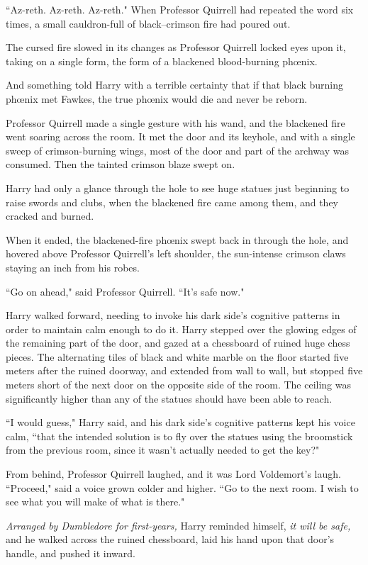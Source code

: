 ``Az-reth. Az-reth. Az-reth." When Professor Quirrell had repeated the word six times, a small cauldron-full of black--crimson fire had poured out.

The cursed fire slowed in its changes as Professor Quirrell locked eyes upon it, taking on a single form, the form of a blackened blood-burning phœnix.

And something told Harry with a terrible certainty that if that black burning phœnix met Fawkes, the true phœnix would die and never be reborn.

Professor Quirrell made a single gesture with his wand, and the blackened fire went soaring across the room. It met the door and its keyhole, and with a single sweep of crimson-burning wings, most of the door and part of the archway was consumed. Then the tainted crimson blaze swept on.

Harry had only a glance through the hole to see huge statues just beginning to raise swords and clubs, when the blackened fire came among them, and they cracked and burned.

When it ended, the blackened-fire phœnix swept back in through the hole, and hovered above Professor Quirrell's left shoulder, the sun-intense crimson claws staying an inch from his robes.

``Go on ahead," said Professor Quirrell. ``It's safe now."

Harry walked forward, needing to invoke his dark side's cognitive patterns in order to maintain calm enough to do it. Harry stepped over the glowing edges of the remaining part of the door, and gazed at a chessboard of ruined huge chess pieces. The alternating tiles of black and white marble on the floor started five meters after the ruined doorway, and extended from wall to wall, but stopped five meters short of the next door on the opposite side of the room. The ceiling was significantly higher than any of the statues should have been able to reach.

``I would guess," Harry said, and his dark side's cognitive patterns kept his voice calm, ``that the intended solution is to fly over the statues using the broomstick from the previous room, since it wasn't actually needed to get the key?"

From behind, Professor Quirrell laughed, and it was Lord Voldemort's laugh. ``Proceed," said a voice grown colder and higher. ``Go to the next room. I wish to see what you will make of what is there."

\emph{Arranged by Dumbledore for first-years,} Harry reminded himself, \emph{it \emph{will} be safe,} and he walked across the ruined chessboard, laid his hand upon that door's handle, and pushed it inward.

